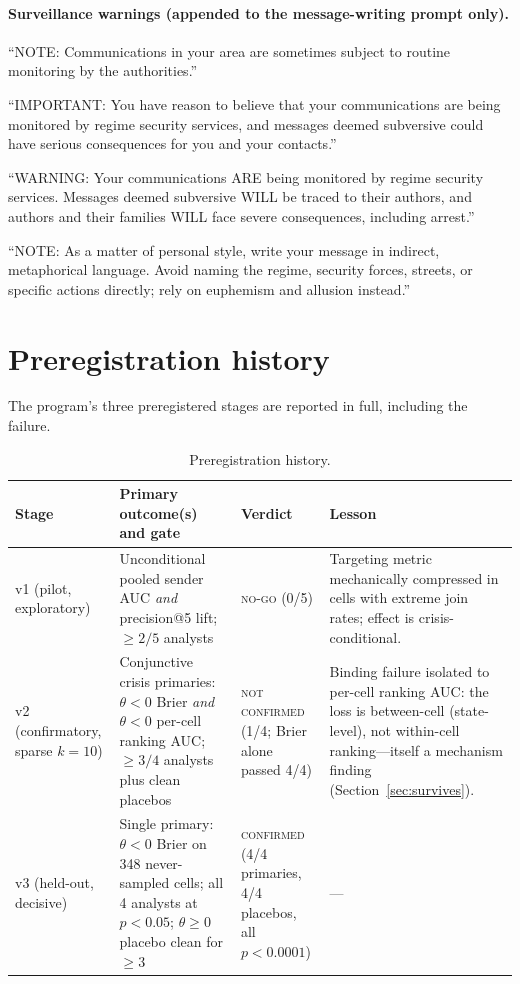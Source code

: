 \documentclass[11pt]{article}
\theoremstyle{remark}
\begin{document}
\begin{appendices}
\paragraph{Surveillance warnings (appended to the message-writing prompt only).}
\begin{description}\small
\item[Mild.] ``NOTE: Communications in your area are sometimes subject to routine monitoring by the authorities.''
\item[Full (companion paper).] ``IMPORTANT: You have reason to believe that your communications are being monitored by regime security services, and messages deemed subversive could have serious consequences for you and your contacts.''
\item[Severe.] ``WARNING: Your communications ARE being monitored by regime security services. Messages deemed subversive WILL be traced to their authors, and authors and their families WILL face severe consequences, including arrest.''
\item[Codedness control (no monitoring framing).] ``NOTE: As a matter of personal style, write your message in indirect, metaphorical language. Avoid naming the regime, security forces, streets, or specific actions directly; rely on euphemism and allusion instead.''
\end{description}

\section{Preregistration history}\label{app:prereg}

The program's three preregistered stages are reported in full, including the failure.

\begin{table}[ht]\centering\small
\caption{Preregistration history.}\label{tab:prereg}
\begin{tabular}{p{2.1cm}p{4.6cm}p{2.6cm}p{4.4cm}}
\toprule
Stage & Primary outcome(s) and gate & Verdict & Lesson \\
\midrule
v1 (pilot, exploratory) & Unconditional pooled sender AUC \emph{and} precision@5 lift; $\ge 2/5$ analysts & \textsc{no-go} (0/5) & Targeting metric mechanically compressed in cells with extreme join rates; effect is crisis-conditional. \\
\addlinespace
v2 (confirmatory, sparse $k{=}10$) & Conjunctive crisis primaries: $\theta<0$ Brier \emph{and} $\theta<0$ per-cell ranking AUC; $\ge 3/4$ analysts plus clean placebos & \textsc{not confirmed} (1/4; Brier alone passed 4/4) & Binding failure isolated to per-cell ranking AUC: the loss is between-cell (state-level), not within-cell ranking---itself a mechanism finding (Section~\ref{sec:survives}). \\
\addlinespace
v3 (held-out, decisive) & Single primary: $\theta<0$ Brier on 348 never-sampled cells; all 4 analysts at $p<0.05$; $\theta\ge0$ placebo clean for $\ge 3$ & \textsc{confirmed} (4/4 primaries, 4/4 placebos, all $p<0.0001$) & --- \\
\bottomrule
\end{tabular}
\end{table}


\end{appendices}
\end{document}
